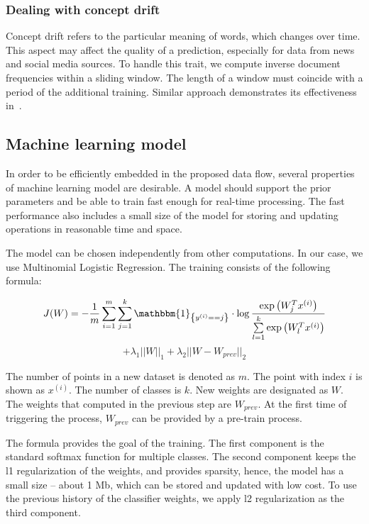 \subsubsection{Dealing with concept drift}

Concept drift refers to the particular meaning of words, which changes over time. This aspect may affect the quality of a prediction, especially for data from news and social media sources. To handle this trait, we compute inverse document frequencies within a sliding window. The length of a window must coincide with a period of the additional training. Similar approach demonstrates its effectiveness in~\cite{klinkenberg2000detecting}.

\subsection{Machine learning model \label{ML}}

In order to be efficiently embedded in the proposed data flow, several properties of machine learning model are desirable. A model should support the prior parameters and be able to train fast enough for real-time processing. The fast performance also includes a small size of the model for storing and updating operations in reasonable time and space.

The model can be chosen independently from other computations. In our case, we use Multinomial Logistic Regression. The training consists of the following formula:

\begin{center}

$$ J(W) = -\frac{1}{m} \sum \limits_{i = 1}^{m} \sum \limits_{j = 1}^{k} \mathbbm{1}_{\left\{y^{(i)} == j\right\}} \cdot \log \frac{\exp\left({W_{j}^Tx^{(i)}}\right) }{\sum \limits_{l = 1}^{k}  \exp\left({W_{l}^Tx^{(i)}}\right) }$$ 
 $$ +  \lambda_1 ||W||_1 + \lambda_2 ||W - W_{prev}||_2 $$

\end{center} 

The number of points in a new dataset is denoted as $m$. The point with index $i$ is shown as $x^{(i)}$. The number of classes is $k$. New weights are designated as $W$. The weights that computed in the previous step are $W_{prev}$. At the first time of triggering the process, $W_{prev}$ can be provided by a pre-train process.  

The formula provides the goal of the training. The first component is the standard softmax function for multiple classes. The second component keeps the l1 regularization of the weights, and provides sparsity, hence, the model has a small size -- about 1 Mb, which can be stored and updated with low cost. To use the previous history of the classifier weights, we apply l2 regularization as the third component. 

